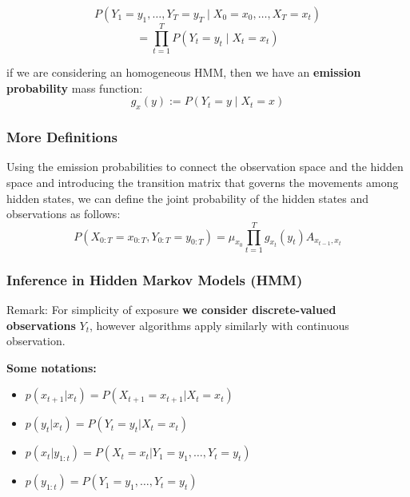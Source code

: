 \documentclass[xcolor=dvipsnames, compress]{beamer}
\begin{document}
\begin{frame}
\begin{equation*}
{P}\left(Y_{1}=y_{1},\ldots,Y_{T}=y_{T}\mid X_{0}=x_{0},\ldots,X_{T}=x_{t}\right)
\end{equation*}	
\begin{equation*}
=\prod_{t=1}^{T}{P}\left(Y_{t}=y_{t}\mid X_{t}=x_{t}\right)
\end{equation*}	

if we are considering an homogeneous HMM, then we have an  \textbf{emission probability} mass function:
\begin{equation*}
g_{x}(y):={P}\left(Y_{t}=y\mid X_{t}=x\right)
\end{equation*}	
\end{frame}
%
\begin{frame}
\frametitle{More Definitions}
Using the emission probabilities to connect the observation space and the hidden space and introducing the transition matrix that governs the movements among hidden states, we can define the  joint probability of the hidden states and observations as follows:
\begin{equation*}
{P}\left(X_{0:T}=x_{0:T},Y_{0:T}=y_{0:T}\right)=\mu_{x_{0}}\prod_{t=1}^{T}g_{x_{t}}\left(y_{t}\right)A_{x_{t-1},x_{t}}
\end{equation*}	
\end{frame}


\begin{frame}
\frametitle{Inference in Hidden Markov Models (HMM)}
\begin{block}{Remark:}
For simplicity of exposure \textbf{we consider discrete-valued observations} $Y_t$, however algorithms apply similarly with continuous observation.
\end{block}
\vspace{0.3cm}

\textbf{Some notations:}
\begin{itemize}
	\item $p(x_{t+1}|x_t) = P( X_{t+1}= x_{t+1}|X_t = x_t)$
	\item $p(y_{t}|x_t) = P( Y_{t}= y_{t}|X_t = x_t)$
	\item $p(x_{t}|y_{1:t}) = P( X_{t}= x_{t}|Y_1 = y_1, \ldots, Y_t = y_t )$
	\item $p(y_{1:t}) = P(Y_1 = y_1, \ldots, Y_t = y_t )$
\end{itemize}
\end{frame}
\end{document}
